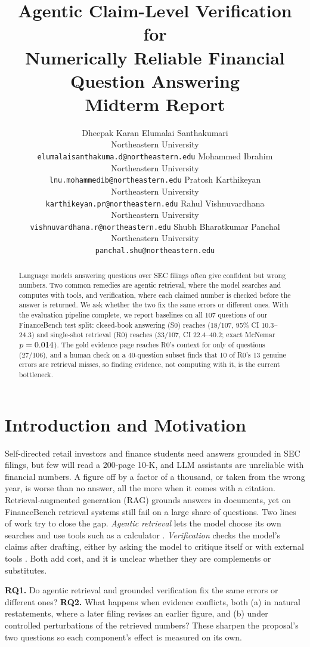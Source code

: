 \documentclass{article}
\title{Agentic Claim-Level Verification for\\Numerically Reliable Financial Question Answering\\[4pt]\large Midterm Report}
\author{%
  Dheepak Karan Elumalai Santhakumari\\
  Northeastern University\\
  \texttt{elumalaisanthakuma.d@northeastern.edu}
  \And
  Mohammed Ibrahim\\
  Northeastern University\\
  \texttt{lnu.mohammedib@northeastern.edu}
  \AND
  Pratosh Karthikeyan\\
  Northeastern University\\
  \texttt{karthikeyan.pr@northeastern.edu}
  \AND
  Rahul Vishnuvardhana\\
  Northeastern University\\
  \texttt{vishnuvardhana.r@northeastern.edu}
  \And
  Shubh Bharatkumar Panchal\\
  Northeastern University\\
  \texttt{panchal.shu@northeastern.edu}
}
\begin{document}
\maketitle

\begin{abstract}
Language models answering questions over SEC filings often give confident but wrong numbers. Two common remedies are agentic retrieval, where the model searches and computes with tools, and verification, where each claimed number is checked before the answer is returned. We ask whether the two fix the same errors or different ones. With the evaluation pipeline complete, we report baselines on all 107 questions of our FinanceBench test split: closed-book answering (S0) reaches \SzeroAll{} (18/107, 95\% CI 10.3--24.3) and single-shot retrieval (R0) reaches \RzeroAll{} (33/107, CI 22.4--40.2; exact McNemar $p=0.014$). The gold evidence page reaches R0's context for only \GoldRetrieved{} of questions (27/106), and a human check on a 40-question subset finds that 10 of R0's 13 genuine errors are retrieval misses, so finding evidence, not computing with it, is the current bottleneck.
\end{abstract}

\section{Introduction and Motivation}
Self-directed retail investors and finance students need answers grounded in SEC filings, but few will read a 200-page 10-K, and LLM assistants are unreliable with financial numbers. A figure off by a factor of a thousand, or taken from the wrong year, is worse than no answer, all the more when it comes with a citation. Retrieval-augmented generation (RAG) \citep{lewis2020rag} grounds answers in documents, yet on FinanceBench \citep{islam2023financebench} retrieval systems still fail on a large share of questions. Two lines of work try to close the gap. \emph{Agentic retrieval} lets the model choose its own searches and use tools such as a calculator \citep{yao2023react,schick2023toolformer}. \emph{Verification} checks the model's claims after drafting, either by asking the model to critique itself \citep{dhuliawala2024cove} or with external tools \citep{gou2024critic}. Both add cost, and it is unclear whether they are complements or substitutes.

\textbf{RQ1.} Do agentic retrieval and grounded verification fix the same errors or different ones? \textbf{RQ2.} What happens when evidence conflicts, both (a) in natural restatements, where a later filing revises an earlier figure, and (b) under controlled perturbations of the retrieved numbers? These sharpen the proposal's two questions so each component's effect is measured on its own.
\end{document}
